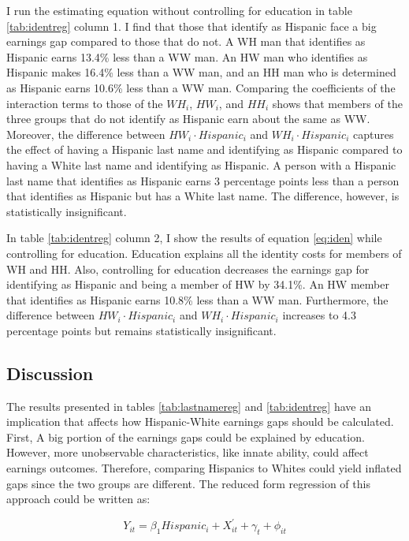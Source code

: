 \documentclass[12pt, fullpage]{article}
\begin{document}
I run the estimating equation without controlling for education in table \ref{tab:identreg} column 1. I find that those that identify as Hispanic face a big earnings gap compared to those that do not. A WH man that identifies as Hispanic earns 13.4\% less than a WW man. An HW man who identifies as Hispanic makes 16.4\% less than a WW man, and an HH man who is determined as Hispanic earns 10.6\% less than a WW man. Comparing the coefficients of the interaction terms to those of the $WH_{i}$, $HW_{i}$, and $HH_{i}$ shows that members of the three groups that do not identify as Hispanic earn about the same as WW.
Moreover, the difference between $HW_{i} \cdot Hispanic_{i}$  and $WH_{i} \cdot Hispanic_{i}$ captures the effect of having a Hispanic last name and identifying as Hispanic compared to having a White last name and identifying as Hispanic. A person with a Hispanic last name that identifies as Hispanic earns 3 percentage points less than a person that identifies as Hispanic but has a White last name. The difference, however, is statistically insignificant.

In table  \ref{tab:identreg} column 2, I show the results of equation \ref{eq:iden} while controlling for education. Education explains all the identity costs for members of WH and HH. Also, controlling for education decreases the earnings gap for identifying as Hispanic and being a member of HW by 34.1\%. An HW member that identifies as Hispanic earns 10.8\% less than a WW man. Furthermore, the difference between $HW_{i} \cdot Hispanic_{i}$  and $WH_{i} \cdot Hispanic_{i}$ increases to 4.3 percentage points but remains statistically insignificant.
\subsection{Discussion}
 
 The results presented in tables \ref{tab:lastnamereg} and \ref{tab:identreg} have an implication that affects how Hispanic-White earnings gaps should be calculated. First, A big portion of the earnings gaps could be explained by education. However, more unobservable characteristics, like innate ability, could affect earnings outcomes. Therefore, comparing Hispanics to Whites could yield inflated gaps since the two groups are different. The reduced form regression of this approach could be written as:
 
 \begin{equation} \label{eq:naive}
 Y_{it} = \beta_{1} Hispanic_{i} + X_{it}^{\prime} + \gamma_{t}+\phi_{it}
 \end{equation}
 
\end{document}
